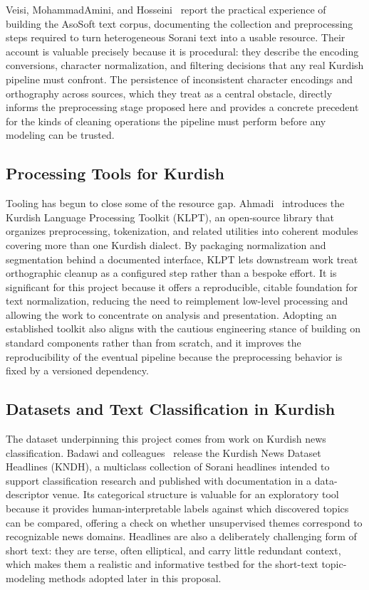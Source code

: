 \documentclass[12pt,a4paper]{article}
\begin{document}
Veisi, MohammadAmini, and Hosseini~\cite{veisiKurdishLanguageProcessing2019} report the practical experience of building the AsoSoft text corpus, documenting the collection and preprocessing steps required to turn heterogeneous Sorani text into a usable resource. Their account is valuable precisely because it is procedural: they describe the encoding conversions, character normalization, and filtering decisions that any real Kurdish pipeline must confront. The persistence of inconsistent character encodings and orthography across sources, which they treat as a central obstacle, directly informs the preprocessing stage proposed here and provides a concrete precedent for the kinds of cleaning operations the pipeline must perform before any modeling can be trusted.

\subsection{Processing Tools for Kurdish}
Tooling has begun to close some of the resource gap. Ahmadi~\cite{ahmadiKLPTKurdishLanguage2020} introduces the Kurdish Language Processing Toolkit (KLPT), an open-source library that organizes preprocessing, tokenization, and related utilities into coherent modules covering more than one Kurdish dialect. By packaging normalization and segmentation behind a documented interface, KLPT lets downstream work treat orthographic cleanup as a configured step rather than a bespoke effort. It is significant for this project because it offers a reproducible, citable foundation for text normalization, reducing the need to reimplement low-level processing and allowing the work to concentrate on analysis and presentation. Adopting an established toolkit also aligns with the cautious engineering stance of building on standard components rather than from scratch, and it improves the reproducibility of the eventual pipeline because the preprocessing behavior is fixed by a versioned dependency.

\subsection{Datasets and Text Classification in Kurdish}
The dataset underpinning this project comes from work on Kurdish news classification. Badawi and colleagues~\cite{badawiKurdishNewsDataset2023} release the Kurdish News Dataset Headlines (KNDH), a multiclass collection of Sorani headlines intended to support classification research and published with documentation in a data-descriptor venue. Its categorical structure is valuable for an exploratory tool because it provides human-interpretable labels against which discovered topics can be compared, offering a check on whether unsupervised themes correspond to recognizable news domains. Headlines are also a deliberately challenging form of short text: they are terse, often elliptical, and carry little redundant context, which makes them a realistic and informative testbed for the short-text topic-modeling methods adopted later in this proposal.
\end{document}
